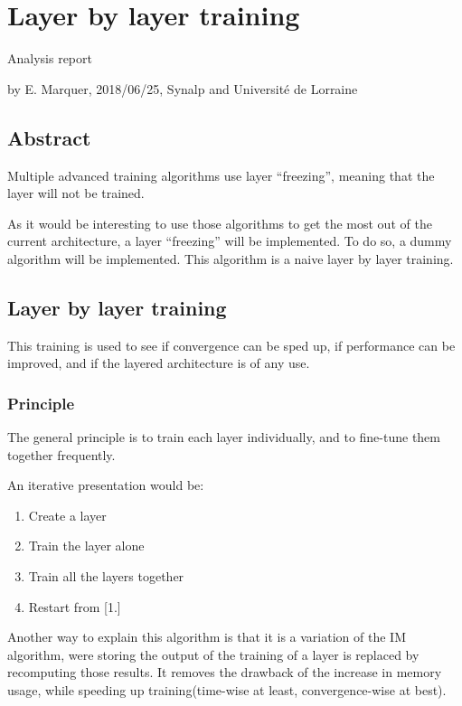 \section*{Layer by layer training}

Analysis report

by E. Marquer, 2018/06/25, Synalp and Université de Lorraine

\subsection{Abstract}

Multiple advanced training algorithms use layer ``freezing'', meaning
that the layer will not be trained.

As it would be interesting to use those algorithms to get the most out
of the current architecture, a layer ``freezing'' will be implemented.
To do so, a dummy algorithm will be implemented. This algorithm is a
naive layer by layer training.

\subsection{Layer by layer training}

This training is used to see if convergence can be sped up, if
performance can be improved, and if the layered architecture is of any
use.

\subsubsection{Principle}

The general principle is to train each layer individually, and to
fine-tune them together frequently.

An iterative presentation would be:

\begin{enumerate}
\def\labelenumi{\arabic{enumi}.}
\item
  Create a layer
\item
  Train the layer alone
\item
  Train all the layers together
\item
  Restart from {[}1.{]}
\end{enumerate}

Another way to explain this algorithm is that it is a variation of the
IM algorithm, were storing the output of the training of a layer is
replaced by recomputing those results. It removes the drawback of the
increase in memory usage, while speeding up training(time-wise at least,
convergence-wise at best).

